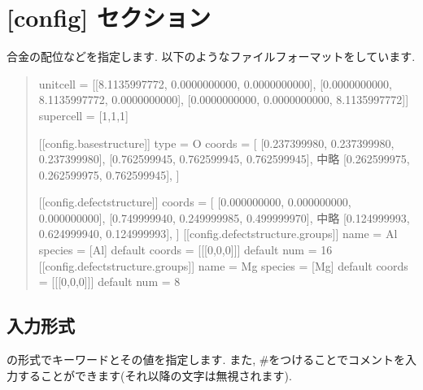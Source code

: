 \documentclass[letterpaper,10pt,dvipdfmx]{sphinxmanual}
\begin{document}
\section{{[}config{]} セクション}
\label{\detokenize{file_specification/parameter_config:config}}\label{\detokenize{file_specification/parameter_config::doc}}
合金の配位などを指定します.
以下のようなファイルフォーマットをしています.
\begin{quote}

\begin{sphinxVerbatim}[commandchars=\\\{\}]
[config]
unitcell = [[8.1135997772, 0.0000000000, 0.0000000000],
            [0.0000000000, 8.1135997772, 0.0000000000],
            [0.0000000000, 0.0000000000, 8.1135997772]]
supercell = [1,1,1]

[[config.base\PYGZus{}structure]]
type = \PYGZdq{}O\PYGZdq{}
coords = [
    [0.237399980, 0.237399980, 0.237399980],
    [0.762599945, 0.762599945, 0.762599945],
    \PYGZsh{}\PYGZsh{} 中略
    [0.262599975, 0.262599975, 0.762599945],
    ]

[[config.defect\PYGZus{}structure]]
coords = [
    [0.000000000, 0.000000000, 0.000000000],
    [0.749999940, 0.249999985, 0.499999970],
    \PYGZsh{}\PYGZsh{} 中略
    [0.124999993, 0.624999940, 0.124999993],
    ]
[[config.defect\PYGZus{}structure.groups]]
name = \PYGZsq{}Al\PYGZsq{}
\PYGZsh{} species = [\PYGZsq{}Al\PYGZsq{}]    \PYGZsh{} default
\PYGZsh{} coords = [[[0,0,0]]]  \PYGZsh{} default
num = 16
[[config.defect\PYGZus{}structure.groups]]
name = \PYGZsq{}Mg\PYGZsq{}
\PYGZsh{} species = [\PYGZsq{}Mg\PYGZsq{}]    \PYGZsh{} default
\PYGZsh{} coords = [[[0,0,0]]]  \PYGZsh{} default
num = 8
\end{sphinxVerbatim}
\end{quote}


\subsection{入力形式}
\label{\detokenize{file_specification/parameter_config:id1}}
 の形式でキーワードとその値を指定します.
また, \#をつけることでコメントを入力することができます(それ以降の文字は無視されます).
\end{document}
